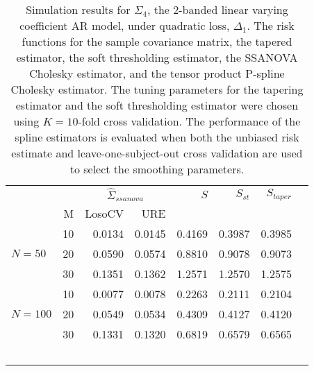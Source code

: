 \documentclass[12pt]{article}
\theoremstyle{definition}
\begin{document}
\begin{table}[ht]
\centering
\caption{Simulation results for $\Sigma_4$, the 2-banded linear varying coefficient AR model, under quadratic loss, $\Delta_1$. The risk functions for the sample covariance matrix, the tapered estimator, the soft thresholding estimator, the SSANOVA Cholesky estimator, and the tensor product P-spline Cholesky estimator. The tuning parameters for the tapering estimator and the soft thresholding estimator were chosen using $K = 10$-fold cross validation. The performance of the spline estimators is evaluated when both the unbiased risk estimate and leave-one-subject-out cross validation are used to select the smoothing parameters.}
\begin{tabular}{l|r|rrrrrr}
&  & \multicolumn{2}{c}{$\hat{\Sigma}_{ssanova}$} & $S$ & $S_{st}$ & $S_{taper}$ \\ 
&M & \mbox{LosoCV} & \mbox{URE} &  \\ 
  \hline
 &    10 & 0.0134 &  0.0145	& 0.4169 & 0.3987 & 0.3985 \\ 
$N = 50$ &    20 & 0.0590 & 0.0574 & 0.8810& 0.9078 & 0.9073 \\ 
 &    30 & 0.1351 &  0.1362	& 1.2571  & 1.2570 & 1.2575\\ \hdashline
     &    10 & 0.0077 &  0.0078 & 0.2263  & 0.2111 & 0.2104 \\ 
  $N = 100$ &    20 & 0.0549 & 0.0534  & 0.4309 & 0.4127 & 0.4120 \\ 
   &    30 & 0.1331 & 0.1320 & 0.6819  & 0.6579 & 0.6565 \\\
\end{tabular}
\end{table}


\end{document}
